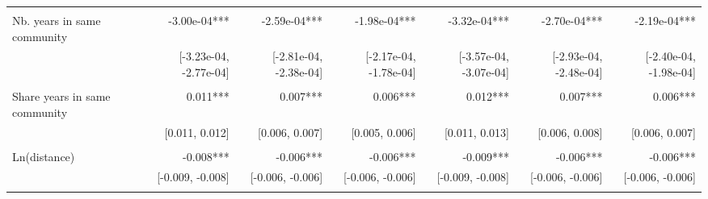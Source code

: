 \begin{table}[!h]
\begin{tabular}{lllllll}
  \multicolumn{1}{|r}{} &
  \multicolumn{1}{r}{} &
  \multicolumn{1}{r}{} &
  \multicolumn{1}{r}{} &
  \multicolumn{1}{r}{} &
  \multicolumn{1}{r}{} \\
\multicolumn{1}{l}{Nb. years in same community} &
  \multicolumn{1}{|r}{-3.00e-04***} &
  \multicolumn{1}{r}{-2.59e-04***} &
  \multicolumn{1}{r}{-1.98e-04***} &
  \multicolumn{1}{r}{-3.32e-04***} &
  \multicolumn{1}{r}{-2.70e-04***} &
  \multicolumn{1}{r}{-2.19e-04***} \\
\multicolumn{1}{l}{} &
  \multicolumn{1}{|r}{[-3.23e-04, -2.77e-04]} &
  \multicolumn{1}{r}{[-2.81e-04, -2.38e-04]} &
  \multicolumn{1}{r}{[-2.17e-04, -1.78e-04]} &
  \multicolumn{1}{r}{[-3.57e-04, -3.07e-04]} &
  \multicolumn{1}{r}{[-2.93e-04, -2.48e-04]} &
  \multicolumn{1}{r}{[-2.40e-04, -1.98e-04]} \\
\multicolumn{1}{l}{} &
  \multicolumn{1}{|r}{} &
  \multicolumn{1}{r}{} &
  \multicolumn{1}{r}{} &
  \multicolumn{1}{r}{} &
  \multicolumn{1}{r}{} &
  \multicolumn{1}{r}{} \\
\multicolumn{1}{l}{Share years in same community} &
  \multicolumn{1}{|r}{0.011***} &
  \multicolumn{1}{r}{0.007***} &
  \multicolumn{1}{r}{0.006***} &
  \multicolumn{1}{r}{0.012***} &
  \multicolumn{1}{r}{0.007***} &
  \multicolumn{1}{r}{0.006***} \\
\multicolumn{1}{l}{} &
  \multicolumn{1}{|r}{[0.011,   0.012]} &
  \multicolumn{1}{r}{[0.006,   0.007]} &
  \multicolumn{1}{r}{[0.005,   0.006]} &
  \multicolumn{1}{r}{[0.011,   0.013]} &
  \multicolumn{1}{r}{[0.006,   0.008]} &
  \multicolumn{1}{r}{[0.006,   0.007]} \\
\multicolumn{1}{l}{} &
  \multicolumn{1}{|r}{} &
  \multicolumn{1}{r}{} &
  \multicolumn{1}{r}{} &
  \multicolumn{1}{r}{} &
  \multicolumn{1}{r}{} &
  \multicolumn{1}{r}{} \\
\multicolumn{1}{l}{Ln(distance)} &
  \multicolumn{1}{|r}{-0.008***} &
  \multicolumn{1}{r}{-0.006***} &
  \multicolumn{1}{r}{-0.006***} &
  \multicolumn{1}{r}{-0.009***} &
  \multicolumn{1}{r}{-0.006***} &
  \multicolumn{1}{r}{-0.006***} \\
\multicolumn{1}{l}{} &
  \multicolumn{1}{|r}{[-0.009,  -0.008]} &
  \multicolumn{1}{r}{[-0.006,  -0.006]} &
  \multicolumn{1}{r}{[-0.006,  -0.006]} &
  \multicolumn{1}{r}{[-0.009,  -0.008]} &
  \multicolumn{1}{r}{[-0.006,  -0.006]} &
  \multicolumn{1}{r}{[-0.006,  -0.006]} \\
\multicolumn{1}{l}{} &
  \multicolumn{1}{|r}{} &
  \multicolumn{1}{r}{} &
  \multicolumn{1}{r}{} &
  \multicolumn{1}{r}{} &

\end{tabular}
\end{table}
